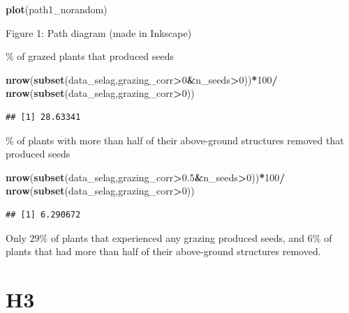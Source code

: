 \documentclass[
]{article}
\newenvironment{Shaded}{\begin{snugshade}}{\end{snugshade}}
\newcommand{\DecValTok}[1]{\textcolor[rgb]{0.00,0.00,0.81}{#1}}
\newcommand{\FloatTok}[1]{\textcolor[rgb]{0.00,0.00,0.81}{#1}}
\newcommand{\KeywordTok}[1]{\textcolor[rgb]{0.13,0.29,0.53}{\textbf{#1}}}
\newcommand{\NormalTok}[1]{#1}
\newcommand{\OperatorTok}[1]{\textcolor[rgb]{0.81,0.36,0.00}{\textbf{#1}}}
\newcommand{\StringTok}[1]{\textcolor[rgb]{0.31,0.60,0.02}{#1}}
\begin{document}
\begin{Shaded}
\begin{Highlighting}[]
\KeywordTok{plot}\NormalTok{(path1\_norandom)}
\end{Highlighting}
\end{Shaded}

Figure 1: Path diagram (made in Inkscape)

\% of grazed plants that produced seeds

\begin{Shaded}
\begin{Highlighting}[]
\KeywordTok{nrow}\NormalTok{(}\KeywordTok{subset}\NormalTok{(data\_selag,grazing\_corr}\OperatorTok{\textgreater{}}\DecValTok{0}\OperatorTok{\&}\NormalTok{n\_seeds}\OperatorTok{\textgreater{}}\DecValTok{0}\NormalTok{))}\OperatorTok{*}\DecValTok{100}\OperatorTok{/}
\StringTok{  }\KeywordTok{nrow}\NormalTok{(}\KeywordTok{subset}\NormalTok{(data\_selag,grazing\_corr}\OperatorTok{\textgreater{}}\DecValTok{0}\NormalTok{))}
\end{Highlighting}
\end{Shaded}

\begin{verbatim}
## [1] 28.63341
\end{verbatim}

\% of plants with more than half of their above-ground structures
removed that produced seeds

\begin{Shaded}
\begin{Highlighting}[]
\KeywordTok{nrow}\NormalTok{(}\KeywordTok{subset}\NormalTok{(data\_selag,grazing\_corr}\OperatorTok{\textgreater{}}\FloatTok{0.5}\OperatorTok{\&}\NormalTok{n\_seeds}\OperatorTok{\textgreater{}}\DecValTok{0}\NormalTok{))}\OperatorTok{*}\DecValTok{100}\OperatorTok{/}
\StringTok{  }\KeywordTok{nrow}\NormalTok{(}\KeywordTok{subset}\NormalTok{(data\_selag,grazing\_corr}\OperatorTok{\textgreater{}}\DecValTok{0}\NormalTok{))}
\end{Highlighting}
\end{Shaded}

\begin{verbatim}
## [1] 6.290672
\end{verbatim}

Only 29\% of plants that experienced any grazing produced seeds, and 6\%
of plants that had more than half of their above-ground structures
removed.

\hypertarget{h3}{%
\section{H3}\label{h3}}
\end{document}
